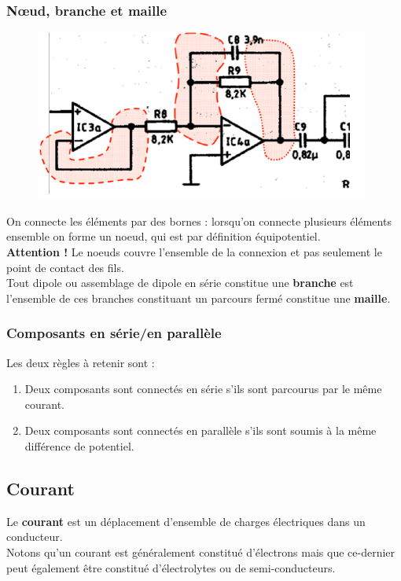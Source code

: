\documentclass	[11pt, a4paper, openany]{book}
\begin{document}
\subsubsection{Nœud, branche et maille}
\begin{figure}
\includegraphics[scale=0.5]{img/image2.png}
\end{figure}
On connecte les éléments par des bornes : lorsqu'on connecte plusieurs éléments ensemble on forme un noeud, qui est par définition équipotentiel.\\
\textbf{Attention !} Le noeuds couvre l'ensemble de la connexion et pas seulement le point de contact des fils.\\

Tout dipole ou assemblage de dipole en série constitue une \textbf{branche} est l'ensemble de ces branches constituant un parcours fermé constitue une \textbf{maille}.

\subsubsection{Composants en série/en parallèle}
Les deux règles à retenir sont :
\begin{enumerate}
\item Deux composants sont connectés en série s'ils sont parcourus par le même
courant.
\item Deux composants sont connectés en parallèle s'ils sont soumis à la même
différence de potentiel.
\end{enumerate}

\subsection{Courant}
Le \textbf{courant} est un déplacement d'ensemble de charges électriques dans un conducteur.\\
Notons qu'un courant est généralement constitué d'électrons mais que ce-dernier peut également être constitué d'électrolytes ou de semi-conducteurs.
\end{document}
